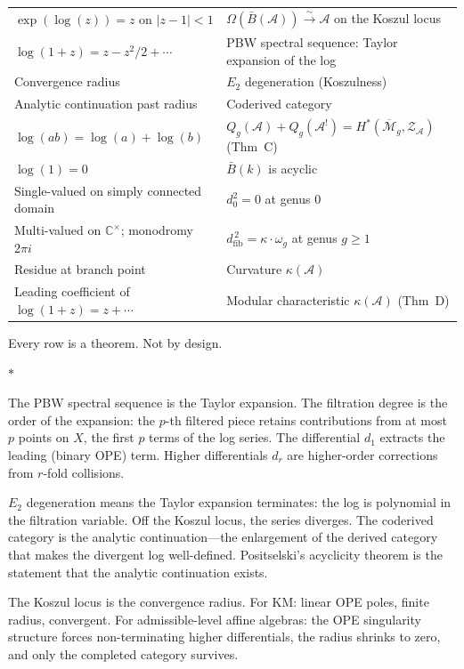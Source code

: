 \documentclass[11pt]{article}
\newcommand{\cA}{\mathcal{A}}
\newcommand{\cM}{\mathcal{M}}
\newcommand{\cZ}{\mathcal{Z}}
\newcommand{\B}{\bar{B}}
\newcommand{\C}{\mathbb{C}}
\newcommand{\dzero}{d_0}
\newcommand{\dfib}{d_{\mathrm{fib}}}
\newcommand{\sep}{\bigskip\begin{center}$*$\end{center}\medskip}
\begin{document}
\medskip
\begin{tabular}{@{}ll@{}}
$\exp(\log(z)) = z$ on $|z-1| < 1$
  & $\Omega(\B(\cA)) \xrightarrow{\sim} \cA$ on the Koszul locus \\[3pt]
$\log(1{+}z) = z - z^2/2 + \cdots$
  & PBW spectral sequence: Taylor expansion of the log \\[3pt]
Convergence radius
  & $E_2$ degeneration (Koszulness) \\[3pt]
Analytic continuation past radius
  & Coderived category \\[3pt]
$\log(ab) = \log(a) + \log(b)$
  & $Q_g(\cA) + Q_g(\cA^!) = H^*(\overline{\cM}_g, \cZ_\cA)$
  \quad(Thm~C) \\[3pt]
$\log(1) = 0$
  & $\B(k)$ is acyclic \\[3pt]
Single-valued on simply connected domain
  & $\dzero^2 = 0$ at genus $0$ \\[3pt]
Multi-valued on $\C^\times$; monodromy $2\pi i$
  & $\dfib^{\,2} = \kappa \cdot \omega_g$ at genus $g \geq 1$ \\[3pt]
Residue at branch point
  & Curvature $\kappa(\cA)$ \\[3pt]
Leading coefficient of $\log(1{+}z) = z + \cdots$
  & Modular characteristic $\kappa(\cA)$ \quad(Thm~D)
\end{tabular}

\medskip

Every row is a theorem.  Not by design.

\sep

The PBW spectral sequence is the Taylor expansion.  The filtration
degree is the order of the expansion: the $p$-th filtered piece
retains contributions from at most $p$ points on $X$, the first
$p$ terms of the log series.  The differential $d_1$ extracts the
leading (binary OPE) term.  Higher differentials $d_r$ are
higher-order corrections from $r$-fold collisions.

$E_2$ degeneration means the Taylor expansion terminates: the
log is polynomial in the filtration variable.  Off the Koszul locus,
the series diverges.  The coderived category is the analytic
continuation---the enlargement of the derived category that makes the
divergent log well-defined.  Positselski's acyclicity theorem is
the statement that the analytic continuation exists.

The Koszul locus is the convergence radius.  For KM: linear OPE
poles, finite radius, convergent.  For admissible-level affine
algebras: the OPE singularity structure forces non-terminating
higher differentials, the radius shrinks to zero, and only the
completed category survives.
\end{document}
